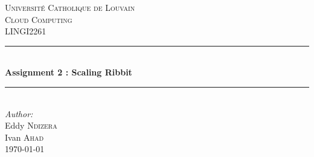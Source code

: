 \documentclass[11pt,a4paper]{article}
\begin{document}
\begin{titlepage}

\newcommand{\HRule}{\rule{\linewidth}{0.5mm}} %

\center %
 

\textsc{\LARGE Université Catholique de Louvain}\\[1.5cm] %
\textsc{\Large Cloud Computing}\\[0.5cm] %
\textsc{\large LINGI2261}\\[0.5cm] %


\HRule \\[0.4cm]
{ \huge \bfseries Assignment 2 : Scaling Ribbit}\\[0.4cm] %
\HRule \\[1.5cm]
 



\Large \emph{Author:}\\
Eddy \textsc{Ndizera}\\
Ivan \textsc{Ahad} \\[3cm] %


{\large \today}\\[3cm] %


 

\vfill %

\end{titlepage}
\end{document}
